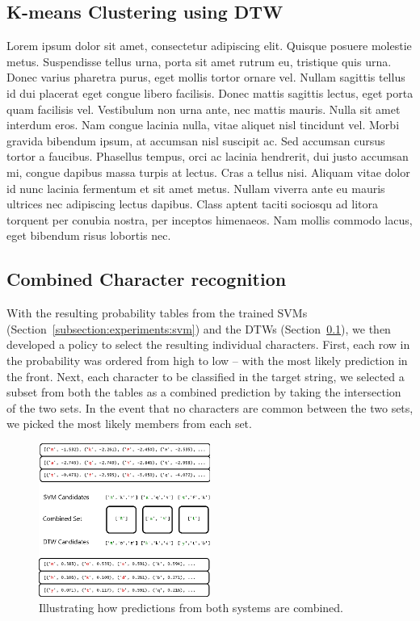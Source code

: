 \documentclass[12pt]{article}
\begin{document}
	
	\subsection{K-means Clustering using DTW}
	\label{subsection:experiments:dtw}
	Lorem ipsum dolor sit amet, consectetur adipiscing elit. Quisque posuere molestie metus. Suspendisse tellus urna, porta sit amet rutrum eu, tristique quis urna. Donec varius pharetra purus, eget mollis tortor ornare vel. Nullam sagittis tellus id dui placerat eget congue libero facilisis. Donec mattis sagittis lectus, eget porta quam facilisis vel. Vestibulum non urna ante, nec mattis mauris. Nulla sit amet interdum eros. Nam congue lacinia nulla, vitae aliquet nisl tincidunt vel. Morbi gravida bibendum ipsum, at accumsan nisl suscipit ac. Sed accumsan cursus tortor a faucibus. Phasellus tempus, orci ac lacinia hendrerit, dui justo accumsan mi, congue dapibus massa turpis at lectus. Cras a tellus nisi. Aliquam vitae dolor id nunc lacinia fermentum et sit amet metus. Nullam viverra ante eu mauris ultrices nec adipiscing lectus dapibus. Class aptent taciti sociosqu ad litora torquent per conubia nostra, per inceptos himenaeos. Nam mollis commodo lacus, eget bibendum risus lobortis nec.
	
	\subsection{Combined Character recognition}
	\label{subsection:experiments:combinedchar}
		
	With the resulting probability tables from the trained SVMs (Section~\ref{subsection:experiments:svm}) and the DTWs (Section~\ref{subsection:experiments:dtw}), we then developed a policy to select the resulting individual characters. First, each row in the probability was ordered from high to low -- with the most likely prediction in the front. Next, each character to be classified in the target string, we selected a subset from both the tables as a combined prediction by taking the intersection of the two sets. In the event that no characters are common between the two sets, we picked the most likely members from each set. 
	
	\begin{figure}[htbp!]
	\centering
	\includegraphics[width=0.5\textwidth]{combined_predictions.eps}
	\caption{Illustrating how predictions from both systems are combined.}
	\label{figure:combining_characters}
	\end{figure}
	
\end{document}
